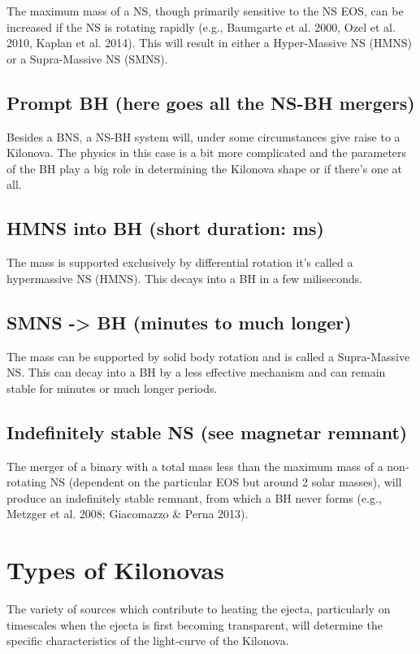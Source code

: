 The maximum mass of a NS, though primarily sensitive to the NS EOS, can be increased if the NS is rotating rapidly (e.g., Baumgarte et al. 2000, Ozel et al. 2010, Kaplan et al. 2014). This will result in either a Hyper-Massive NS (HMNS) or a Supra-Massive NS (SMNS).

\subsection{Prompt BH (here goes all the NS-BH mergers)}

Besides a BNS, a NS-BH system will, under some circumstances give raise to a Kilonova. The physics in this case is a bit more complicated and the parameters of the BH play a big role in determining the Kilonova shape or if there's one at all.

\subsection{HMNS into BH (short duration: ms)}

The mass is supported exclusively by differential rotation it's called a hypermassive NS (HMNS).
This decays into a BH in a few miliseconds.

\subsection{SMNS -> BH (minutes to much longer)}

The mass can be supported by solid body rotation and is called a Supra-Massive NS.
This can decay into a BH by a less effective mechanism and can remain stable for minutes or much longer periods.

\subsection{Indefinitely stable NS (see magnetar remnant)}

The merger of a binary with a total mass less than the maximum mass of a non-rotating NS (dependent on the particular EOS but around 2 solar masses), will produce an indefinitely stable remnant, from which a BH never forms (e.g., Metzger et al. 2008; Giacomazzo \& Perna 2013).

\section{Types of Kilonovas}

The variety of sources which contribute to heating the ejecta, particularly on timescales when the ejecta is first becoming transparent, 
will determine the specific characteristics of the light-curve of the Kilonova.

